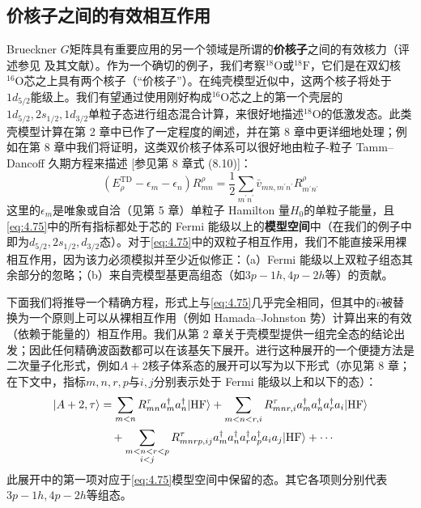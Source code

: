 \subsection{价核子之间的有效相互作用}

Brueckner $G$矩阵具有重要应用的另一个领域是所谓的\textbf{价核子}之间的有效核力（评述参见 \cite{Ku74b}
及其文献）。作为一个确切的例子，我们考察$^{18}\mathrm{O}$或$^{18}\mathrm{F}$，它们是在双幻核$^{16}\mathrm{O}$芯之上具有两个核子（“价核子”）。在纯壳模型近似中，这两个核子将处于$1d_{5/2}$能级上。我们有望通过使用刚好构成$^{16}\mathrm{O}$芯之上的第一个壳层的$1d_{5/2},2s_{1/2},1d_{3/2}$单粒子态进行组态混合计算，来很好地描述$^{18}\mathrm{O}$的低激发态。此类壳模型计算在第
2 章中已作了一定程度的阐述，并在第 8 章中更详细地处理；例如在第 8 章中我们将证明，这类双价核子体系可以很好地由粒子-粒子 Tamm–Dancoff
久期方程来描述 {[}参见第 8 章式 (8.10){]}：
\begin{equation}
(E^{\text{TD}}_{\rho}-\epsilon_{m}-\epsilon_{n})R^{\rho}_{mn}=\frac{1}{2}\sum_{m^{\prime}n^{\prime}}\bar{v}_{mn,m^{\prime}n^{\prime}}R^{\rho}_{m^{\prime}n^{\prime}}\label{eq:4.75}
\end{equation}
这里的$\epsilon_{m}$是唯象或自洽（见第 5 章）单粒子 Hamilton 量$H_{0}$的单粒子能量，且\ref{eq:4.75}中的所有指标都处于芯的
Fermi 能级以上的\textbf{模型空间}中（在我们的例子中即为$d_{5/2},2s_{1/2},d_{3/2}$态）。对于\ref{eq:4.75}中的双粒子相互作用，我们不能直接采用裸相互作用，因为该力必须模拟并至少近似修正：（a）Fermi
能级以上双粒子组态其余部分的忽略；（b）来自壳模型基更高组态（如$3p-1h,4p-2h$等）的贡献。

下面我们将推导一个精确方程，形式上与\ref{eq:4.75}几乎完全相同，但其中的$\bar{v}$被替换为一个原则上可以从裸相互作用（例如
Hamada–Johnston 势）计算出来的有效（依赖于能量的）相互作用。我们从第 2 章关于壳模型提供一组完全态的结论出发；因此任何精确波函数都可以在该基矢下展开。进行这种展开的一个便捷方法是二次量子化形式，例如$A+2$核子体系态的展开可以写为以下形式（亦见第
8 章；在下文中，指标$m,n,r,p$与$i,j$分别表示处于 Fermi 能级以上和以下的态）：
\begin{align}
|A+2,\tau\rangle & =\sum_{m<n}R^{\tau}_{mn}a^{\dagger}_{m}a^{\dagger}_{n}|\text{HF}\rangle+\sum_{m<n<r,i}R^{\tau}_{mnr,i}a^{\dagger}_{m}a^{\dagger}_{n}a^{\dagger}_{r}a_{i}|\text{HF}\rangle\nonumber \\
 & \quad+\sum_{\begin{subarray}{c}
m<n<r<p\\
i<j
\end{subarray}}R^{\tau}_{mnrp,ij}a^{\dagger}_{m}a^{\dagger}_{n}a^{\dagger}_{r}a^{\dagger}_{p}a_{i}a_{j}|\text{HF}\rangle+\cdots\label{eq:4.76}
\end{align}
此展开中的第一项对应于\ref{eq:4.75}模型空间中保留的态。其它各项则分别代表$3p-1h,4p-2h$等组态。

